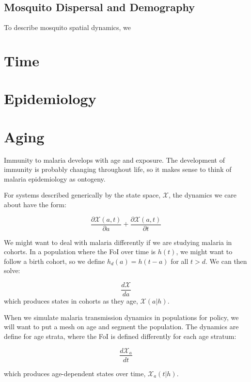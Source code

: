 \documentclass[
]{book}
\begin{document}
\hypertarget{mosquito-dispersal-and-demography}{%
\subsection{Mosquito Dispersal and Demography}\label{mosquito-dispersal-and-demography}}

To describe mosquito spatial dynamics, we

\hypertarget{time}{%
\section{Time}\label{time}}

\hypertarget{epidemiology}{%
\section{Epidemiology}\label{epidemiology}}

\hypertarget{aging}{%
\section{Aging}\label{aging}}

Immunity to malaria develops with age and exposure. The development of immunity is probably changing throughout life, so it makes sense to think of malaria epidemiology as ontogeny.

For systems described generically by the state space, \(\mathscr X\), the dynamics we care about have the form:

\[\frac{\partial {\mathscr X}(a,t)}{\partial a} + \frac{\partial {\mathscr X}(a,t)}{\partial t}\]

We might want to deal with malaria differently if we are studying malaria in cohorts. In a population where the FoI over time is \(h(t)\), we might want to follow a birth cohort, so we define \(h_d(a) = h(t-a)\) for all \(t>d\). We can then solve:

\[\frac{d{\mathscr X}}{d a} \]
which produces states in cohorts as they age, \({\mathscr X}(a|h).\)

When we simulate malaria transmission dynamics in populations for policy, we will want to put a mesh on age and segment the population. The dynamics are define for age strata, where the FoI is defined differently for each age stratum:

\[\frac{d{\mathscr X}_a}{d t}\]

which produces age-dependent states over time, \({\mathscr X}_a(t|h).\)
\end{document}
